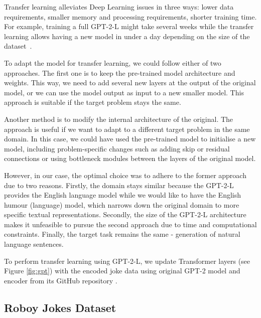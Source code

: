 Transfer learning alleviates Deep Learning issues in three ways: lower data requirements, smaller memory and processing requirements, shorter training time. For example, training a full GPT-2-L might take several weeks while the transfer learning allows having a new model in under a day depending on the size of the dataset~\parencite{transferlearn}.

To adapt the model for transfer learning, we could follow either of two approaches. The first one is to keep the pre-trained model architecture and weights. This way, we need to add several new layers at the output of the original model, or we can use the model output as input to a new smaller model. This approach is suitable if the target problem stays the same.

Another method is to modify the internal architecture of the original. The approach is useful if we want to adapt to a different target problem in the same domain. In this case, we could have used the pre-trained model to initialise a new model, including problem-specific changes such as adding skip or residual connections or using bottleneck modules between the layers of the original model.

However, in our case, the optimal choice was to adhere to the former approach due to two reasons. Firstly, the domain stays similar because the GPT-2-L provides the English language model while we would like to have the English humour (language) model, which narrows down the original domain to more specific textual representations. Secondly, the size of the GPT-2-L architecture makes it unfeasible to pursue the second approach due to time and computational constraints. Finally, the target task remains the same - generation of natural language sentences.

To perform transfer learning using GPT-2-L, we update Transformer layers (see Figure \ref{fig:gpt}) with the encoded joke data using original GPT-2 model and encoder from its GitHub repository \parencite{gpt2}.

\subsection{Roboy Jokes Dataset}

